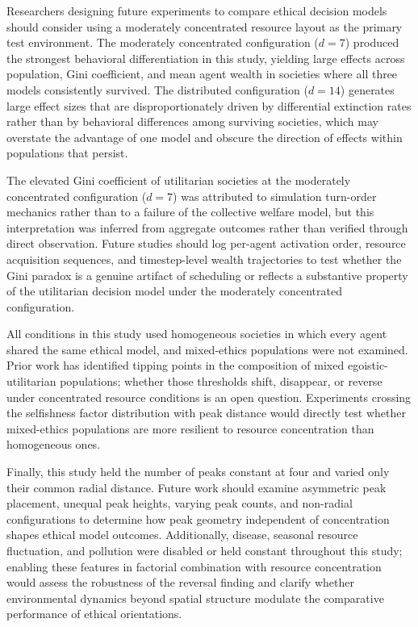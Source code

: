 \documentclass{icsthesis}
\begin{document}
\begin{mainmatter}
Researchers designing future experiments to compare ethical decision models should consider using a moderately concentrated resource layout as the primary test environment. The moderately concentrated configuration ($d = 7$) produced the strongest behavioral differentiation in this study, yielding large effects across population, Gini coefficient, and mean agent wealth in societies where all three models consistently survived. The distributed configuration ($d = 14$) generates large effect sizes that are disproportionately driven by differential extinction rates rather than by behavioral differences among surviving societies, which may overstate the advantage of one model and obscure the direction of effects within populations that persist.

The elevated Gini coefficient of utilitarian societies at the moderately concentrated configuration ($d = 7$) was attributed to simulation turn-order mechanics rather than to a failure of the collective welfare model, but this interpretation was inferred from aggregate outcomes rather than verified through direct observation. Future studies should log per-agent activation order, resource acquisition sequences, and timestep-level wealth trajectories to test whether the Gini paradox is a genuine artifact of scheduling or reflects a substantive property of the utilitarian decision model under the moderately concentrated configuration.

All conditions in this study used homogeneous societies in which every agent shared the same ethical model, and mixed-ethics populations were not examined. Prior work has identified tipping points in the composition of mixed egoistic-utilitarian populations; whether those thresholds shift, disappear, or reverse under concentrated resource conditions is an open question. Experiments crossing the selfishness factor distribution with peak distance would directly test whether mixed-ethics populations are more resilient to resource concentration than homogeneous ones.

Finally, this study held the number of peaks constant at four and varied only their common radial distance. Future work should examine asymmetric peak placement, unequal peak heights, varying peak counts, and non-radial configurations to determine how peak geometry independent of concentration shapes ethical model outcomes. Additionally, disease, seasonal resource fluctuation, and pollution were disabled or held constant throughout this study; enabling these features in factorial combination with resource concentration would assess the robustness of the reversal finding and clarify whether environmental dynamics beyond spatial structure modulate the comparative performance of ethical orientations.


\end{mainmatter}
\end{document}

